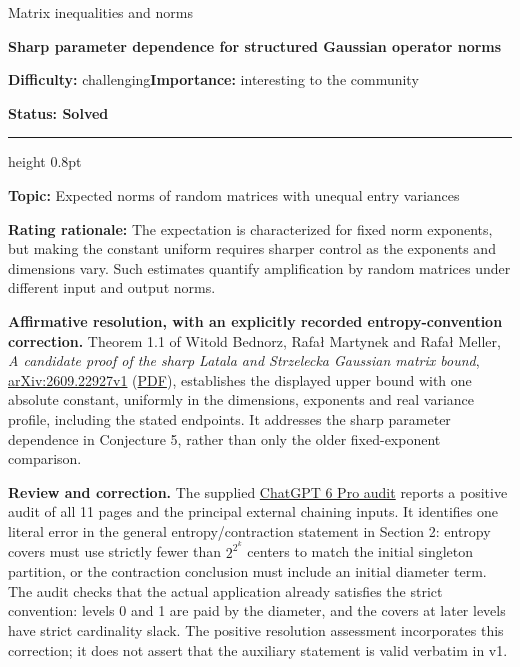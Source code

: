 \documentclass[11pt,a4paper]{article}
\makeatletter
\renewcommand{\subsection}{\Needspace{4\baselineskip}\@startsection{subsection}{2}{0pt}{9pt plus 1pt minus 1pt}{3pt}{\sffamily\bfseries\normalsize\color{ink}}}
\makeatother
\begin{document}
{\sffamily\small\color{muted}Matrix inequalities and norms\par}
\vspace{3pt}
{\raggedright{}\sffamily\bfseries\fontsize{21}{24}\selectfont\color{ink}Sharp
parameter dependence for structured Gaussian operator norms\par}
\vspace{7pt}
{\sffamily\small\textbf{Difficulty:} challenging\quad\textbf{Importance:} interesting
to the community\par}
{\sffamily\small\bfseries\color{accent}Status: Solved\par}
\vspace{4pt}
{\color{accent}\hrule height 0.8pt}
\vspace{6pt}
\textbf{Topic:} Expected norms of random matrices with unequal entry
variances

\textbf{Rating rationale:} The expectation is characterized for fixed
norm exponents, but making the constant uniform requires sharper control
as the exponents and dimensions vary. Such estimates quantify
amplification by random matrices under different input and output norms.

\subsection{Resolution --- 2026-09-30}\label{resolution-2026-09-30}

\textbf{Affirmative resolution, with an explicitly recorded
entropy-convention correction.} Theorem 1.1 of Witold Bednorz, Rafał
Martynek and Rafał Meller, \emph{A candidate proof of the sharp Latala
and Strzelecka Gaussian matrix bound},
\href{https://arxiv.org/abs/2609.22927v1}{arXiv:2609.22927v1}
(\href{https://arxiv.org/pdf/2609.22927v1}{PDF}), establishes the
displayed upper bound with one absolute constant, uniformly in the
dimensions, exponents and real variance profile, including the stated
endpoints. It addresses the sharp parameter dependence in Conjecture 5,
rather than only the older fixed-exponent comparison.

\textbf{Review and correction.} The supplied
\href{https://chatgpt.com/share/6abd40d2-7d54-83ed-96b3-d674c1c20eb0}{ChatGPT
6 Pro audit} reports a positive audit of all 11 pages and the principal
external chaining inputs. It identifies one literal error in the general
entropy/contraction statement in Section 2: entropy covers must use
strictly fewer than \(2^{2^k}\) centers to match the initial singleton
partition, or the contraction conclusion must include an initial
diameter term. The audit checks that the actual application already
satisfies the strict convention: levels 0 and 1 are paid by the
diameter, and the covers at later levels have strict cardinality slack.
The positive resolution assessment incorporates this correction; it does
not assert that the auxiliary statement is valid verbatim in v1.
\end{document}
